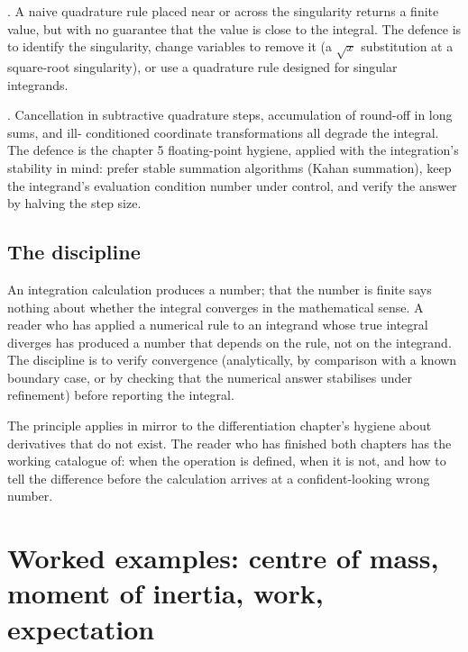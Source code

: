 . A naive quadrature rule placed near
or across the singularity returns a finite value, but with no
guarantee that the value is close to the integral. The defence is
to identify the singularity, change variables to remove it (a
$\sqrt{x}$ substitution at a square-root singularity), or use a
quadrature rule designed for singular integrands.

. Cancellation in subtractive
quadrature steps, accumulation of round-off in long sums, and ill-
conditioned coordinate transformations all degrade the integral.
The defence is the chapter 5 floating-point hygiene, applied with
the integration's stability in mind: prefer stable summation
algorithms (Kahan summation), keep the integrand's evaluation
condition number under control, and verify the answer by halving
the step size.

\subsection{The discipline}

\begin{principle}
An integration calculation produces a number; that the number is
finite says nothing about whether the integral converges in the
mathematical sense. A reader who has applied a numerical rule to
an integrand whose true integral diverges has produced a number
that depends on the rule, not on the integrand. The discipline is
to verify convergence (analytically, by comparison with a known
boundary case, or by checking that the numerical answer stabilises
under refinement) before reporting the integral.
\end{principle}

The principle applies in mirror to the differentiation chapter's
hygiene about derivatives that do not exist. The reader who has
finished both chapters has the working catalogue of: when the
operation is defined, when it is not, and how to tell the
difference before the calculation arrives at a confident-looking
wrong number.

\section{Worked examples: centre of mass, moment of inertia, work,
expectation}

